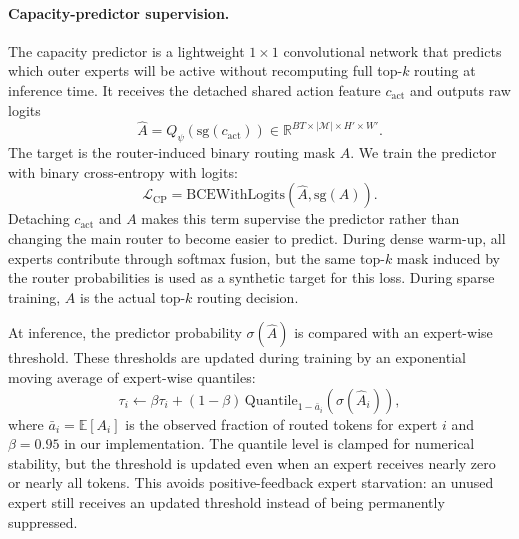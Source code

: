 \paragraph{Capacity-predictor supervision.}
The capacity predictor is a lightweight $1\times1$ convolutional network that predicts which outer experts will be active without recomputing full top-$k$ routing at inference time. It receives the detached shared action feature $c_{\mathrm{act}}$ and outputs raw logits
\[
    \widehat{A}=Q_\psi(\mathrm{sg}(c_{\mathrm{act}}))
    \in\mathbb{R}^{BT\times |\mathcal{M}|\times H'\times W'} .
\]
The target is the router-induced binary routing mask $A$. We train the predictor with binary cross-entropy with logits:
\[
    \mathcal{L}_{\mathrm{CP}}
    =
    \mathrm{BCEWithLogits}\!\left(\widehat{A},\mathrm{sg}(A)\right).
\]
Detaching $c_{\mathrm{act}}$ and $A$ makes this term supervise the predictor rather than changing the main router to become easier to predict. During dense warm-up, all experts contribute through softmax fusion, but the same top-$k$ mask induced by the router probabilities is used as a synthetic target for this loss. During sparse training, $A$ is the actual top-$k$ routing decision.

At inference, the predictor probability $\sigma(\widehat{A})$ is compared with an expert-wise threshold. These thresholds are updated during training by an exponential moving average of expert-wise quantiles:
\[
    \tau_i \leftarrow \beta \tau_i + (1-\beta)\,
    \mathrm{Quantile}_{1-\bar{a}_i}\!\left(\sigma(\widehat{A}_i)\right),
\]
where $\bar{a}_i=\mathbb{E}[A_i]$ is the observed fraction of routed tokens for expert $i$ and $\beta=0.95$ in our implementation. The quantile level is clamped for numerical stability, but the threshold is updated even when an expert receives nearly zero or nearly all tokens. This avoids positive-feedback expert starvation: an unused expert still receives an updated threshold instead of being permanently suppressed.

